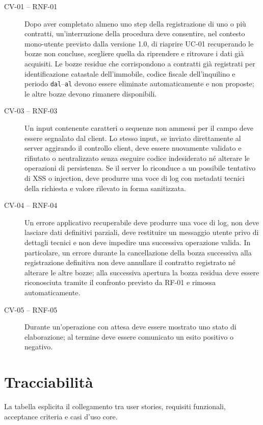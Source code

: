 \documentclass[12pt,a4paper]{article}
\begin{document}
\begin{description}
    \item[CV-01 -- RNF-01] Dopo aver completato almeno uno step della registrazione di uno o più
    contratti, un'interruzione della procedura deve consentire, nel contesto mono-utente previsto
    dalla versione 1.0, di riaprire UC-01 recuperando le bozze non concluse, scegliere quella da
    riprendere e ritrovare i dati già acquisiti. Le bozze residue che corrispondono a contratti già
    registrati per identificazione catastale dell'immobile, codice fiscale dell'inquilino e periodo
    \texttt{dal}--\texttt{al} devono essere eliminate automaticamente e non proposte; le altre
    bozze devono rimanere disponibili.

    \item[CV-03 -- RNF-03] Un input contenente caratteri o sequenze non ammessi per il campo
    deve essere segnalato dal client. Lo stesso input, se inviato direttamente al server aggirando
    il controllo client, deve essere nuovamente validato e rifiutato o neutralizzato senza eseguire
    codice indesiderato né alterare le operazioni di persistenza. Se il server lo riconduce a un
    possibile tentativo di XSS o injection, deve produrre una voce di log con metadati tecnici della
    richiesta e valore rilevato in forma sanitizzata.

    \item[CV-04 -- RNF-04] Un errore applicativo recuperabile deve produrre una voce di
    log, non deve lasciare dati definitivi parziali, deve restituire un messaggio utente privo di
    dettagli tecnici e non deve impedire una successiva operazione valida. In particolare, un errore
    durante la cancellazione della bozza successiva alla registrazione definitiva non deve annullare
    il contratto registrato né alterare le altre bozze; alla successiva apertura la bozza residua deve
    essere riconosciuta tramite il confronto previsto da RF-01 e rimossa automaticamente.

    \item[CV-05 -- RNF-05] Durante un'operazione con attesa deve essere mostrato uno stato
    di elaborazione; al termine deve essere comunicato un esito positivo o negativo.
\end{description}

\section{Tracciabilità}

La tabella esplicita il collegamento tra user stories, requisiti funzionali,
acceptance criteria e casi d'uso core.
\end{document}
